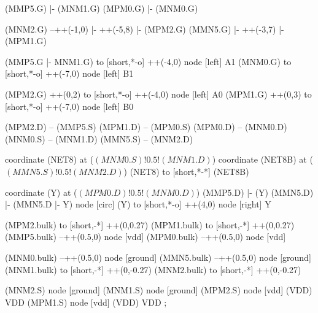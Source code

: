 \begin{circuitikz}[american]
	(MMP5.G) |- (MNM1.G)
	(MPM0.G) |- (MNM0.G)
	
	(MNM2.G) --++(-1,0) |- ++(-5,8) |- (MPM2.G)
	(MMN5.G) |- ++(-3,7) |- (MPM1.G)
	
	(MMP5.G |- MNM1.G) to [short,*-o] ++(-4,0) node [left] {A1}
	(MNM0.G) to [short,*-o] ++(-7,0) node [left] {B1}
	
	(MPM2.G) ++(0,2) to [short,*-o] ++(-4,0) node [left] {A0}
	(MPM1.G) ++(0,3) to [short,*-o] ++(-7,0) node [left] {B0}
	
	(MPM2.D) -- (MMP5.S)
	(MPM1.D) -- (MPM0.S)
	(MPM0.D) -- (MNM0.D)
	(MNM0.S) -- (MNM1.D)
	(MMN5.S) -- (MNM2.D)
	
	coordinate (NET8) at ($(MNM0.S)!0.5!(MNM1.D)$)
	coordinate (NET8B) at ($(MMN5.S)!0.5!(MNM2.D)$)
	(NET8) to [short,*-*] (NET8B)
	
	coordinate (Y) at ($(MPM0.D)!0.5!(MNM0.D)$)
	(MMP5.D) |- (Y)
	(MMN5.D) |- (MMN5.D |- Y) node [circ] {}
	(Y) to [short,*-o] ++(4,0) node [right] {Y}
	
	(MPM2.bulk) to [short,-*] ++(0,0.27)
	(MPM1.bulk) to [short,-*] ++(0,0.27)
	(MMP5.bulk) --++(0.5,0) node [vdd]{}
	(MPM0.bulk) --++(0.5,0) node [vdd]{}
	
	(MNM0.bulk) --++(0.5,0) node [ground]{}
	(MMN5.bulk) --++(0.5,0) node [ground]{}
	(MNM1.bulk) to [short,-*] ++(0,-0.27)	
	(MNM2.bulk) to [short,-*] ++(0,-0.27)
 	

	(MNM2.S) node [ground] {}
	(MNM1.S) node [ground] {}
	(MPM2.S) node [vdd] (VDD) {VDD}
	(MPM1.S) node [vdd] (VDD) {VDD}
;

\end{circuitikz}
